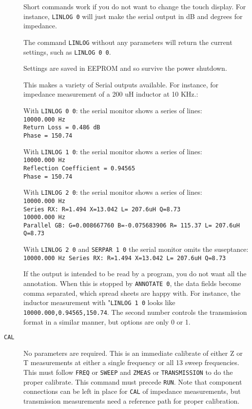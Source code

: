 \begin{description}
   Short commands work if you do not want to change the touch display. For instance, \texttt{LINLOG 0} will
   just make the serial output in dB and degrees for impedance.

   The command \texttt{LINLOG} without any parameters will return the current settings, such as \texttt{LINLOG 0 0}.

   Settings are saved in EEPROM and so survive the power shutdown.

   This makes a variety of Serial outputs available.  For instance, for impedance measurement of a 200 uH inductor at
   10 KHz.:

    With \texttt{LINLOG 0 0}:  the serial monitor shows a series of lines:
      \\ \texttt{10000.000 Hz\\ Return Loss = 0.486 dB\\  Phase = 150.74}

    With \texttt{LINLOG 1 0}:  the serial monitor shows a series of lines:
      \\ \texttt{10000.000 Hz\\ Reflection Coefficient = 0.94565\\  Phase = 150.74}

    With \texttt{LINLOG 2 0}:  the serial monitor shows a series of lines:
      \\ \texttt{10000.000 Hz\\ Series RX: R=1.494 X=13.042 L= 207.6uH Q=8.73}
      \\ \texttt{10000.000 Hz\\ Parallel GB: G=0.008667760 B=-0.075683906 R= 115.37 L= 207.6uH Q=8.73}

    With \texttt{LINLOG 2 0} and \texttt{SERPAR 1 0} the serial monitor omits the suseptance:
      \\ \texttt{10000.000 Hz Series RX: R=1.494 X=13.042 L= 207.6uH Q=8.73}

    If the output is intended to be read by a program, you do not want all the annotation.  When this is stopped by
    \texttt{ANNOTATE 0}, the data fields become comma separated, which spread sheets are happy with.  For instance, the inductor
    measurement with "\texttt{LINLOG 1 0} looks like
      \texttt{10000.000,0.94565,150.74}.
    The second number controls the transmission format in a similar manner, but options are only 0 or 1.

\item[\texttt{CAL}]
No parameters are required.  This is an immediate calibrate of either Z or T measurements at either a single frequency or all 13 sweep frequencies.  This must follow \texttt{FREQ} or \texttt{SWEEP} and \texttt{ZMEAS} or \texttt{TRANSMISSION} to do the proper calibrate.  This command must precede \texttt{RUN}.  Note that component connections can be left in place for \texttt{CAL} of impedance measurements, but transmission measurements need a reference path for proper calibration.


\end{description}
